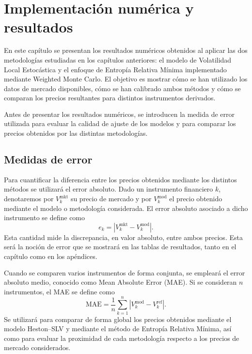\chapter{Implementación numérica y resultados}

En este capítulo se presentan los resultados numéricos obtenidos al aplicar las dos metodologías estudiadas en los capítulos anteriores: el modelo de Volatilidad Local Estocástica y el enfoque de Entropía Relativa Mínima implementado mediante Weighted Monte Carlo. El objetivo es mostrar cómo se han utilizado los datos de mercado disponibles, cómo se han calibrado ambos métodos y cómo se comparan los precios resultantes para distintos instrumentos derivados.\medskip

Antes de presentar los resultados numéricos, se introducen la medida de error utilizada para evaluar la calidad de ajuste de los modelos y para comparar los precios obtenidos por las distintas metodologías. 

\section{Medidas de error} 

Para cuantificar la diferencia entre los precios obtenidos mediante los distintos métodos se utilizará el error absoluto. Dado un instrumento financiero $k$, denotaremos por $V_k^{\mathrm{mkt}}$ su precio de mercado y por $V_k^{\mathrm{mod}}$ el precio obtenido mediante el modelo o metodología considerada. El error absoluto asociado a dicho instrumento se define como 
\begin{equation} 
e_k = \left| V_k^{\mathrm{mkt}} - V_k^{\mathrm{mod}} \right|. \label{eq:error_absoluto} 
\end{equation}
Esta cantidad mide la discrepancia, en valor absoluto, entre ambos precios. Esta será la noción de error que se mostrará en las tablas de resultados, tanto en el capítulo como en los apéndices. 

Cuando se comparen varios instrumentos de forma conjunta, se empleará el error absoluto medio, conocido como Mean Absolute Error (MAE). Si se consideran $n$ instrumentos, el MAE se define como 
\begin{equation} 
\mathrm{MAE} = \frac{1}{n} \sum_{k=1}^{n} \left| V_k^{\mathrm{mod}} - V_k^{\mathrm{ref}} \right|. \label{eq:mae} \end{equation}
Se utilizará para comparar de forma global los precios obtenidos mediante el modelo Heston--SLV y mediante el método de Entropía Relativa Mínima, así como para evaluar la proximidad de cada metodología respecto a los precios de mercado considerados.

